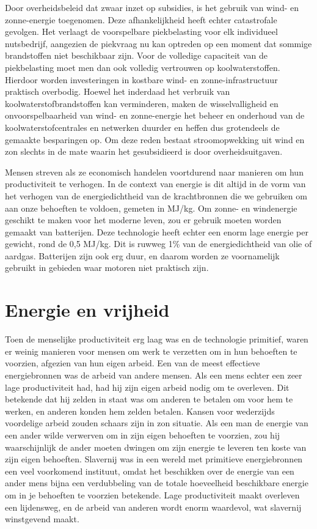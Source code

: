 \documentclass[
  a5paper,
  smalldemyvopaper,11pt,twoside,onecolumn,openright,extrafontsizes,
hidelinks]{memoir}
\begin{document}
Door overheidsbeleid dat zwaar inzet op subsidies, is het gebruik van
wind- en zonne-energie toegenomen. Deze afhankelijkheid heeft echter
catastrofale gevolgen. Het verlaagt de voorspelbare piekbelasting voor
elk individueel nutsbedrijf, aangezien de piekvraag nu kan optreden op
een moment dat sommige brandstoffen niet beschikbaar zijn. Voor de
volledige capaciteit van de piekbelasting moet men dan ook volledig
vertrouwen op koolwaterstoffen. Hierdoor worden investeringen in
kostbare wind- en zonne-infrastructuur praktisch overbodig. Hoewel het
inderdaad het verbruik van koolwaterstofbrandstoffen kan verminderen,
maken de wisselvalligheid en onvoorspelbaarheid van wind- en
zonne-energie het beheer en onderhoud van de koolwaterstofcentrales en
netwerken duurder en heffen dus grotendeels de gemaakte besparingen op.
Om deze reden bestaat stroomopwekking uit wind en zon slechts in de mate
waarin het gesubsidieerd is door overheidsuitgaven.

Mensen streven als ze economisch handelen voortdurend naar manieren om
hun productiviteit te verhogen. In de context van energie is dit altijd
in de vorm van het verhogen van de energiedichtheid van de krachtbronnen
die we gebruiken om aan onze behoeften te voldoen, gemeten in MJ/kg. Om
zonne- en windenergie geschikt te maken voor het moderne leven, zou er
gebruik moeten worden gemaakt van batterijen. Deze technologie heeft
echter een enorm lage energie per gewicht, rond de 0,5 MJ/kg. Dit is
ruwweg 1\% van de energiedichtheid van olie of aardgas. Batterijen zijn
ook erg duur, en daarom worden ze voornamelijk gebruikt in gebieden waar
motoren niet praktisch zijn.

\section{Energie en vrijheid}\label{energie-en-vrijheid}

Toen de menselijke productiviteit erg laag was en de technologie
primitief, waren er weinig manieren voor mensen om werk te verzetten om
in hun behoeften te voorzien, afgezien van hun eigen arbeid. Een van de
meest effectieve energiebronnen was de arbeid van andere mensen. Als een
mens echter een zeer lage productiviteit had, had hij zijn eigen arbeid
nodig om te overleven. Dit betekende dat hij zelden in staat was om
anderen te betalen om voor hem te werken, en anderen konden hem zelden
betalen. Kansen voor wederzijds voordelige arbeid zouden schaars zijn in
zon situatie. Als een man de energie van een ander wilde verwerven om in
zijn eigen behoeften te voorzien, zou hij waarschijnlijk de ander moeten
dwingen om zijn energie te leveren ten koste van zijn eigen behoeften.
Slavernij was in een wereld met primitieve energiebronnen een veel
voorkomend instituut, omdat het beschikken over de energie van een ander
mens bijna een verdubbeling van de totale hoeveelheid beschikbare
energie om in je behoeften te voorzien betekende. Lage productiviteit
maakt overleven een lijdensweg, en de arbeid van anderen wordt enorm
waardevol, wat slavernij winstgevend maakt.
\end{document}
